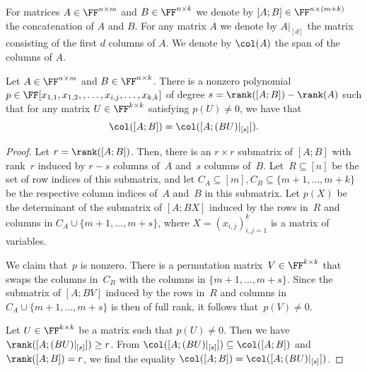 For matrices $A \in \FF^{n\times m}$ and $B \in \FF^{n \times k}$ we denote by $[A; B] \in \FF^{n \times (m+k)}$ the concatenation of $A$ and $B$. For any matrix $A$ we denote by $A|_{[d]}$ the matrix consisting of the first $d$ columns of $A$. We denote by $\col(A)$ the span of the columns of $A$.

\begin{lemma}\label{lem:colspan}
    Let $A \in \FF^{n\times m}$ and $B \in \FF^{n \times k}$. There is a nonzero %
    polynomial $p\in \FF[x_{1,1},x_{1,2},,\ldots,x_{i,j},\dots,x_{k,k}]$ of degree $s = \rank([A;B]) - \rank(A)$ such that for any matrix $U \in \FF^{k\times k}$ satisfying $p(U)\neq 0$, we have that
    \[
    \col([A;B]) = \col([A; (BU)|_{[s]}]).
    \]
\end{lemma}
\begin{proof}
    Let $r = \rank([A;B])$. Then, there is an $r\times r$ submatrix of $[A;B]$ with rank~$r$ induced by $r-s$ columns of~$A$ and~$s$ columns of~$B$.
    Let~$R\subseteq [n]$ be the set of row indices of this submatrix, and let $C_A\subseteq[m], C_B\subseteq \{m+1,\dots,m+k\}$ be the respective column indices of~$A$ and~$B$ in this submatrix.
    Let $p(X)$ be the determinant of the submatrix of $[A;BX]$ induced by the rows in~$R$ and columns in $C_A\cup \{m+1,\dots,m+s\}$, where $X = (x_{i,j})_{i,j=1}^k$ is a matrix of variables.
    
    We claim that~$p$ is nonzero. There is a permutation matrix~$V\in \FF^{k \times k}$ that swaps the columns in~$C_B$ with the columns in $\{m+1,\dots, m+s\}$. Since the submatrix of $[A;BV]$ induced by the rows in~$R$ and columns in $C_A\cup \{m+1,\dots,m+s\}$ is then of full rank, it follows that~$p(V)\ne 0$. 
        
    Let $U \in \FF^{k \times k}$ be a matrix such that $p(U) \neq 0$. 
    Then we have $\rank([A; (BU)|_{[s]}]) \geq r$. From $\col([A; (BU)|_{[s]}])\subseteq \col([A;B])$ and $\rank([A;B]) = r$, we find the equality $\col([A;B]) = \col([A; (BU)|_{[s]}])$.
\end{proof}



